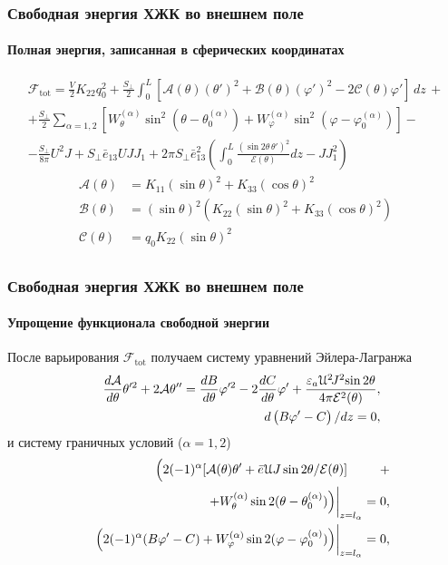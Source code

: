 \documentclass[utf8,secheader]{beamer}
\newcommand{\FF}{\mathcal{F}}
\renewcommand{\AA}{\mathcal{A}}
\newcommand{\BB}{\mathcal{B}}
\newcommand{\CC}{\mathcal{C}}
\newcommand{\EE}{\mathcal{E}}
\renewcommand{\phi}{\varphi}
\begin{document}
\begin{frame}[t]
\frametitle{Свободная энергия ХЖК во внешнем поле}
\framesubtitle{Полная энергия, записанная в сферических координатах}
\vspace{-0.5cm}
\begin{block}{ }\small
\begin{multline}
\FF_\mathrm{tot} =\frac{V}{2}K_{22}q_0^2 + \frac{S_\perp}{2} \int_{0}^{L}\left[ \AA(\theta) (\theta')^2 + \BB(\theta) (\phi ' )^2- 2\CC(\theta)\phi' \right]\, dz\,+\\
+\frac{S_\perp}{2}\sum\limits_{\alpha=1,2} \left[W_\theta^{(\alpha)} \sin^2{\left( \theta - \theta_0^{(\alpha)} \right)} + W_\phi^{(\alpha)} \sin^2{\left( \phi - \phi_0^{(\alpha)} \right)}\right] -\\
-\frac{S_{\!\bot}}{8\pi}U^2 J +S_{\!\bot} \bar{e}_{13}U JJ_1+2\pi S_{\!\bot} \bar{e}_{13}^2\left(\int_{0}^{L}\frac{(\sin 2\theta \,\theta')^2}{{\EE}(\theta)}dz -JJ_1^2\right)
\end{multline}
\begin{align*}
\AA (\theta) &= K_{11}(\sin{\theta})^2 + K_{33}(\cos{\theta})^2 \\
\BB (\theta) &= (\sin{\theta})^2 \left( K_{22}(\sin{\theta})^2 + K_{33} (\cos{\theta})^2  \right) \\
\CC (\theta) &= q_0 K_{22} (\sin{\theta})^2 \\
\end{align*}

\end{block}
\end{frame}

\begin{frame}
	\frametitle{Свободная энергия ХЖК во внешнем поле}
	\framesubtitle{Упрощение функционала свободной энергии}
		После варьирования $\FF_\mathrm{tot}$ получаем систему уравнений Эйлера-Лагранжа
		\begin{eqnarray}
			&&\frac{d\AA}{d\theta}\theta'^2 + 2\AA \theta'' = \frac{d B}{d\theta}\phi'^2 - 2\frac{d C}{d\theta}\phi'
			+ \frac{\varepsilon_a\EuScript{U}^2\! J ^2\!\sin 2\theta}{4\pi\EE^2(\theta)} ,
			\label{eq:E-L1}\\
			&&{d}\left( B\phi' - C \right)/{dz} = 0,
			\label{eq:E-L2}
		\end{eqnarray}
		и систему граничных условий ($\alpha =1,2$)
		\begin{eqnarray}
			&&\left(2(-1)^\alpha [{\AA(\theta)\theta'} + \bar{e} {\EuScript{U}}J\sin2\theta/\EE(\theta)]\phantom{ W_\phi^{(\alpha)}}\right. + \nonumber\\
			&&\hspace{27mm}\left.\left.+ W_\theta^{(\alpha)}\sin2(\theta - \theta_0^{(\alpha)})\right) \right|_{z=l_\alpha} = 0,\label{eq:gran-1}\\
			&&{\left.\left(2(-1)^\alpha (B\phi' - C)
			+W_\phi^{(\alpha)}\sin2(\phi - \phi_0^{(\alpha)})\right) \right|_{z=l_\alpha}} = 0,
			\label{eq:gran-2}
		\end{eqnarray}
\end{frame}
\end{document}
